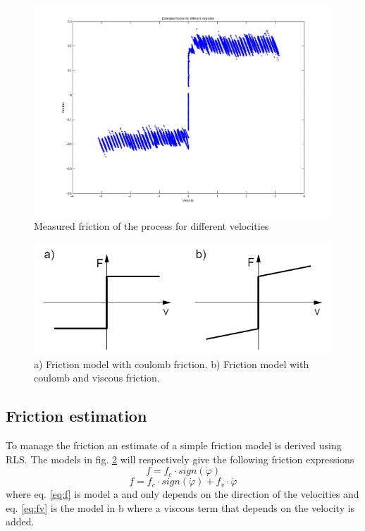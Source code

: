 \documentclass[10pt,a4paper]{article}
\begin{document}
\begin{figure}[!htb]
\centering
\includegraphics[width=1\textwidth]{fric.png}
\caption{Measured friction of the process for different velocities}
\label{fig:fric}
\end{figure}
\begin{figure}[!htb]
\centering
\includegraphics[width=1\textwidth]{frictmodel.png}
\caption{a) Friction model with coulomb friction. b) Friction model with coulomb and viscous friction.}
\label{fig:frictmodel}
\end{figure}
\subsection{Friction estimation}
\label{sec:fricEst}
To manage the friction an estimate of a simple friction model is derived using RLS. The models in fig. \ref{fig:frictmodel} will respectively give the following friction expressions 
\begin{equation}
 f=f_c\cdot sign(\dot{\varphi})
 \label{eq:f}
 \end{equation}
\begin{equation}
 f=f_c\cdot sign(\dot{\varphi})+f_v\cdot \dot{\varphi}
 \label{eq:fv}
 \end{equation}
where eq. \ref{eq:f} is model a and only depends on the direction of the velocities and eq. \ref{eq:fv} is the model in b where a viscous term that depends on the velocity is added.
 
\end{document}
